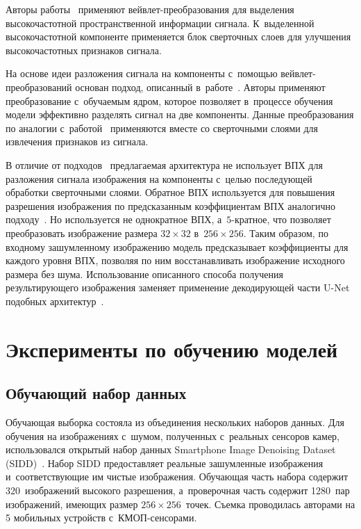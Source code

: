 \begin{multicols}{2}
Авторы работы~\cite{MDIWT} применяют вейв\-лет-пре\-обра\-зо\-ва\-ния для выделения 
высокочастотной пространственной информации сигнала. К~выделенной 
высокочастотной компоненте применяется блок сверточных слоев для улучшения 
вы\-со\-ко\-час\-тот\-ных признаков сигнала.

На основе идеи разложения сигнала на компоненты с~помощью вейв\-лет-пре\-обра\-зо\-ва\-ний 
основан подход, описанный в~работе~\cite{WINNet}. Авторы \mbox{применяют} 
преобразование с~обучаемым ядром, которое позволяет в~процессе обучения модели 
эффективно разделять сигнал на две компоненты. Данные преобразования по аналогии с~работой~\cite{MDIWT} применяются вместе со сверточными слоями для извлечения 
признаков из сигнала.

В отличие от подходов~\cite{MWCNN, MDIWT, WINNet} пред\-ла\-га\-емая архитектура не 
использует ВПХ для разложения сигнала изображения на компоненты с~\mbox{целью} 
последующей обработки сверточными слоями. Обратное ВПХ используется для 
повышения разрешения изображения по предсказанным коэффициентам ВПХ аналогично 
подходу~\cite{DWB}. Но используется не однократное ВПХ, а~$5$-крат\-ное, что 
позволяет преобразовать изображение размера $32 \times 32$ в~$256 \times 256$. 
Таким образом, по входному зашумленному изображению модель предсказывает 
коэффициенты для каждого уровня ВПХ, позволяя по ним восстанавливать изображение 
исходного размера без шума. Использование описанного способа получения 
результирующего изображения заменяет применение декодирующей части U-Net 
подобных архитектур~\cite{MWCNN, MDIWT}.

\section{Эксперименты по обучению моделей}

\subsection{Обучающий набор данных}

Обучающая выборка состояла из объединения нескольких наборов данных. Для 
обучения на изоб\-ра\-же\-ни\-ях с~шумом, полученных с~реальных сенсоров камер, 
использовался открытый набор данных Smartphone Image Denoising Dataset 
(SIDD)~\cite{SIDD_2018_CVPR}. Набор SIDD предоставляет реальные зашумленные 
изображения и~соответствующие им чистые изображения. Обучающая часть набора 
содержит 320~изображений высокого разрешения, а~проверочная часть содержит 
1280~пар изображений, имеющих размер $256\times 256$~точек. Съемка проводилась авторами на 
5 мобильных устройств с~КМОП-сен\-со\-рами.


\end{multicols}
